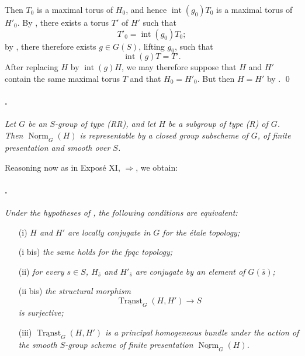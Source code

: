 Then \(T_0\) is a maximal torus of \(H_0\), and hence
\(\operatorname{int}(g_0)T_0\) is a maximal torus of \(H'_0\).
By , there exists a torus \(T'\) of \(H'\) such
that
\[
  T'_0=\operatorname{int}(g_0)T_0;
\]
by , there therefore exists \(g\in G(S)\), lifting
\(g_0\), such that
\[
  \operatorname{int}(g)T=T'.
\]
After replacing \(H\) by \(\operatorname{int}(g)H\), we may
therefore suppose that \(H\) and \(H'\) contain the same maximal
torus \(T\) and that \(H_0=H'_0\). But then \(H=H'\) by .
\qed

\paragraph{.}
\textit{Let \(G\) be an \(S\)-group of type \textup{(RR)}, and let
\(H\) be a subgroup of type \textup{(R)} of \(G\). Then
\(\underline{\operatorname{Norm}}_G(H)\) is representable by a
closed group subscheme of \(G\), of finite presentation and smooth
over \(S\).}

Reasoning now as in Exposé XI, \(\Rightarrow\), we
obtain:

\paragraph{.}
\textit{Under the hypotheses of , the following conditions are
equivalent:}
\begin{enumerate}
  \item[\textup{\SGAInlineRefTarget{sga3:xxii:cor:5.3.11:item:i}(i)}] \textit{\(H\) and \(H'\) are locally conjugate
  in \(G\) for the étale topology;}

  \item[\textup{(i bis)}] \textit{the same holds for the fpqc
  topology;}

  \item[\textup{(ii)}] \textit{for every \(s\in S\),
  \(H_{\bar s}\) and \(H'_{\bar s}\) are conjugate by an element of
  \(G(\bar s)\);}

  \item[\textup{(ii bis)}] \textit{the structural morphism}
  \[
    \underline{\operatorname{Transt}}_G(H,H')
      \longrightarrow S
  \]
  \textit{is surjective;}

  \item[\textup{\SGAInlineRefTarget{sga3:xxii:cor:5.3.11:item:iii}(iii)}]
  \textit{\(\underline{\operatorname{Transt}}_G(H,H')\) is a
  principal homogeneous bundle under the action of the smooth
  \(S\)-group scheme of finite presentation
  \(\underline{\operatorname{Norm}}_G(H)\).}
\end{enumerate}

